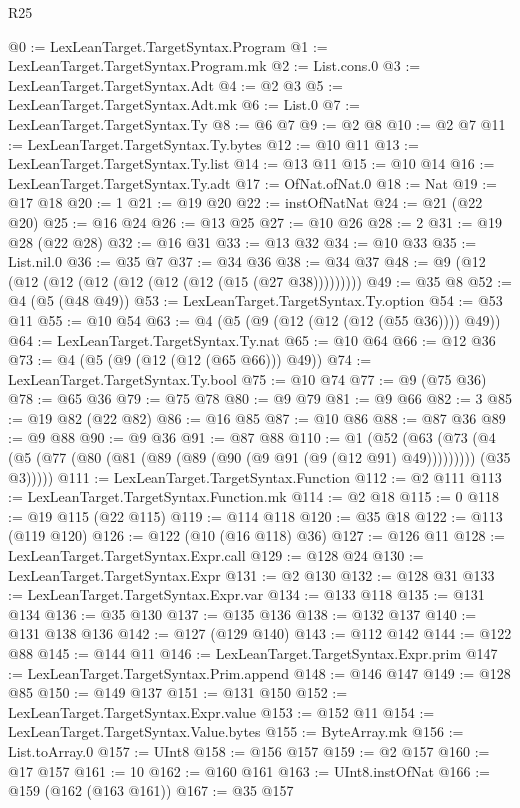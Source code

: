 \begin{lexlean}{R25}
\begin{coremodule}
@0 := LexLeanTarget.TargetSyntax.Program
@1 := LexLeanTarget.TargetSyntax.Program.mk
@2 := List.cons.{0}
@3 := LexLeanTarget.TargetSyntax.Adt
@4 := @2 @3
@5 := LexLeanTarget.TargetSyntax.Adt.mk
@6 := List.{0}
@7 := LexLeanTarget.TargetSyntax.Ty
@8 := @6 @7
@9 := @2 @8
@10 := @2 @7
@11 := LexLeanTarget.TargetSyntax.Ty.bytes
@12 := @10 @11
@13 := LexLeanTarget.TargetSyntax.Ty.list
@14 := @13 @11
@15 := @10 @14
@16 := LexLeanTarget.TargetSyntax.Ty.adt
@17 := OfNat.ofNat.{0}
@18 := Nat
@19 := @17 @18
@20 := 1
@21 := @19 @20
@22 := instOfNatNat
@24 := @21 (@22 @20)
@25 := @16 @24
@26 := @13 @25
@27 := @10 @26
@28 := 2
@31 := @19 @28 (@22 @28)
@32 := @16 @31
@33 := @13 @32
@34 := @10 @33
@35 := List.nil.{0}
@36 := @35 @7
@37 := @34 @36
@38 := @34 @37
@48 := @9 (@12 (@12 (@12 (@12 (@12 (@12 (@12 (@15 (@27 @38)))))))))
@49 := @35 @8
@52 := @4 (@5 (@48 @49))
@53 := LexLeanTarget.TargetSyntax.Ty.option
@54 := @53 @11
@55 := @10 @54
@63 := @4 (@5 (@9 (@12 (@12 (@12 (@55 @36)))) @49))
@64 := LexLeanTarget.TargetSyntax.Ty.nat
@65 := @10 @64
@66 := @12 @36
@73 := @4 (@5 (@9 (@12 (@12 (@65 @66))) @49))
@74 := LexLeanTarget.TargetSyntax.Ty.bool
@75 := @10 @74
@77 := @9 (@75 @36)
@78 := @65 @36
@79 := @75 @78
@80 := @9 @79
@81 := @9 @66
@82 := 3
@85 := @19 @82 (@22 @82)
@86 := @16 @85
@87 := @10 @86
@88 := @87 @36
@89 := @9 @88
@90 := @9 @36
@91 := @87 @88
@110 := @1
    (@52
      (@63
        (@73 (@4 (@5 (@77 (@80 (@81 (@89 (@89 (@90 (@9 @91 (@9 (@12 @91) @49))))))))) (@35 @3)))))
@111 := LexLeanTarget.TargetSyntax.Function
@112 := @2 @111
@113 := LexLeanTarget.TargetSyntax.Function.mk
@114 := @2 @18
@115 := 0
@118 := @19 @115 (@22 @115)
@119 := @114 @118
@120 := @35 @18
@122 := @113 (@119 @120)
@126 := @122 (@10 (@16 @118) @36)
@127 := @126 @11
@128 := LexLeanTarget.TargetSyntax.Expr.call
@129 := @128 @24
@130 := LexLeanTarget.TargetSyntax.Expr
@131 := @2 @130
@132 := @128 @31
@133 := LexLeanTarget.TargetSyntax.Expr.var
@134 := @133 @118
@135 := @131 @134
@136 := @35 @130
@137 := @135 @136
@138 := @132 @137
@140 := @131 @138 @136
@142 := @127 (@129 @140)
@143 := @112 @142
@144 := @122 @88
@145 := @144 @11
@146 := LexLeanTarget.TargetSyntax.Expr.prim
@147 := LexLeanTarget.TargetSyntax.Prim.append
@148 := @146 @147
@149 := @128 @85
@150 := @149 @137
@151 := @131 @150
@152 := LexLeanTarget.TargetSyntax.Expr.value
@153 := @152 @11
@154 := LexLeanTarget.TargetSyntax.Value.bytes
@155 := ByteArray.mk
@156 := List.toArray.{0}
@157 := UInt8
@158 := @156 @157
@159 := @2 @157
@160 := @17 @157
@161 := 10
@162 := @160 @161
@163 := UInt8.instOfNat
@166 := @159 (@162 (@163 @161))
@167 := @35 @157

\end{coremodule}
\end{lexlean}

